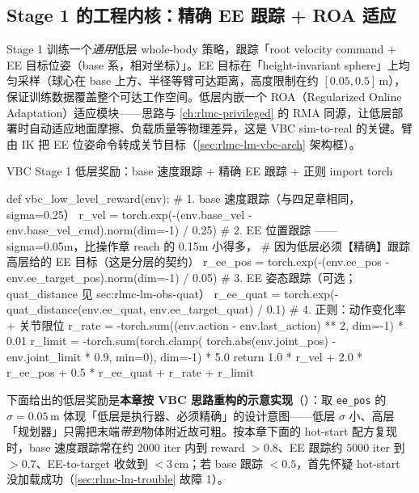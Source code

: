 \subsection{Stage 1 的工程内核：精确 EE 跟踪 + ROA 适应}
\label{sec:rlmc-lm-vbc-stage1}

Stage 1 训练一个\emph{通用}低层 whole-body 策略，跟踪「root velocity command + EE 目标位姿（base 系，相对坐标）」。EE 目标在「height-invariant sphere」上均匀采样（球心在 base 上方、半径等臂可达距离，高度限制在约 $[0.05,0.5]\,$m），保证训练数据覆盖整个可达工作空间。低层内嵌一个 ROA（Regularized Online Adaptation）适应模块——思路与 \cref{ch:rlmc-privileged} 的 RMA 同源，让低层部署时自动适应地面摩擦、负载质量等物理差异，这是 VBC sim-to-real 的关键。臂由 IK 把 EE 位姿命令转成关节目标（\cref{sec:rlmc-lm-vbc-arch} 架构框）。

\begin{codebox}[Python]{VBC Stage 1 低层奖励：base 速度跟踪 + 精确 EE 跟踪 + 正则}
import torch

def vbc_low_level_reward(env):
    # 1. base 速度跟踪（与四足章相同，sigma=0.25）
    r_vel = torch.exp(-(env.base_vel - env.base_vel_cmd).norm(dim=-1) / 0.25)
    # 2. EE 位置跟踪 —— sigma=0.05m，比操作章 reach 的 0.15m 小得多，
    #    因为低层必须【精确】跟踪高层给的 EE 目标（这是分层的契约）
    r_ee_pos = torch.exp(-(env.ee_pos - env.ee_target_pos).norm(dim=-1) / 0.05)
    # 3. EE 姿态跟踪（可选；quat_distance 见 sec:rlmc-lm-obs-quat）
    r_ee_quat = torch.exp(-quat_distance(env.ee_quat, env.ee_target_quat) / 0.1)
    # 4. 正则：动作变化率 + 关节限位
    r_rate  = -torch.sum((env.action - env.last_action) ** 2, dim=-1) * 0.01
    r_limit = -torch.sum(torch.clamp(
        torch.abs(env.joint_pos) - env.joint_limit * 0.9, min=0), dim=-1) * 5.0
    return 1.0 * r_vel + 2.0 * r_ee_pos + 0.5 * r_ee_quat + r_rate + r_limit
\end{codebox}

下面给出的低层奖励是\textbf{本章按 VBC 思路重构的示意实现}（）：取 \verb|ee_pos| 的 $\sigma=0.05\,$m 体现「低层是执行器、必须精确」的设计意图——低层 $\sigma$ 小、高层「规划器」只需把末端\emph{带到}物体附近故可粗。按本章下面的 hot-start 配方复现时，base 速度跟踪常在约 $2000$ iter 内到 reward $>0.8$、EE 跟踪约 $5000$ iter 到 $>0.7$、EE-to-target 收敛到 $<3\,$cm；若 base 跟踪 $<0.5$，首先怀疑 hot-start 没加载成功（\cref{sec:rlmc-lm-trouble} 故障 1）。

